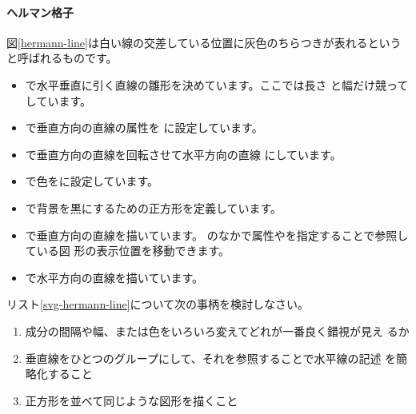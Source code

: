 \paragraph{ヘルマン格子}
 図\ref{hermann-line}は白い線の交差している位置に灰色のちらつきが表れるという
と呼ばれるものです。
\begin{itemize}
 \item {}で水平垂直に引く直線の雛形を決めています。ここでは長さ
       と幅だけ競ってしています。
 \item {}で垂直方向の直線の属性を
       に設定しています。
 \item {}で垂直方向の直線を回転させて水平方向の直線
       にしています。
 \item {}で色をに設定しています。
 \item {}で背景を黒にするための正方形を定義しています。
 \item {}で垂直方向の直線を描いています。
       のなかで属性やを指定することで参照している図
       形の表示位置を移動できます。
 \item {}で水平方向の直線を描いています。
\end{itemize}
\begin{Problem}\upshape
 リスト\ref{svg-hermann-line}について次の事柄を検討しなさい。
\begin{enumerate}
 \item 成分の間隔や幅、または色をいろいろ変えてどれが一番良く錯視が見え
       るか
 \item 垂直線をひとつのグループにして、それを参照することで水平線の記述
       を簡略化すること
 \item 正方形を並べて同じような図形を描くこと
\end{enumerate}
\end{Problem}

